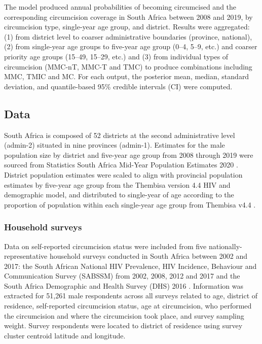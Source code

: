 \documentclass{article}
\begin{document}
The model produced annual probabilities of becoming circumcised and the corresponding circumcision coverage in South Africa between 2008 and 2019, by circumcision type, single-year age group, and district. Results were aggregated: (1) from district level to coarser administrative boundaries (province, national), (2) from single-year age groups to five-year age group (0--4, 5--9, etc.) and coarser priority age groups (15--49, 15--29, etc.) and (3) from individual types of circumcision (MMC-nT, MMC-T and TMC) to produce combinations including MMC, TMIC and MC. For each output, the posterior mean, median, standard deviation, and quantile-based 95\% credible intervals (CI) were computed.


\subsection*{Data}


South Africa is composed of 52 districts at the second administrative level (admin-2) situated in nine provinces (admin-1). Estimates for the male population size by district and five-year age group from 2008 through 2019 were sourced from Statistics South Africa Mid-Year Population Estimates 2020 \cite{StatsSAPop}. District population estimates were scaled to align with provincial population estimates by five-year age group from the Thembisa version 4.4 HIV and demographic model, and distributed to single-year of age according to the proportion of population within each single-year age group from Thembisa v4.4 \cite{johnson2021thembisa}.


\subsubsection*{Household surveys}


Data on self-reported circumcision status were included from five nationally-representative household surveys conducted in South Africa between 2002 and 2017: the South African National HIV Prevalence, HIV Incidence, Behaviour and Communication Survey (SABSSM) from 2002, 2008, 2012 and 2017 \cite{hsrc2017, hsrc2012, hsrc2008, hsrc2002} and the South Africa Demographic and Health Survey (DHS) 2016 \cite{dhs2016}. Information was extracted for 51,261 male respondents across all surveys related to age, district of residence, self-reported circumcision status, age at circumcision, who performed the circumcision and where the circumcision took place, and survey sampling weight. Survey respondents were located to district of residence using survey cluster centroid latitude and longitude.
\end{document}
